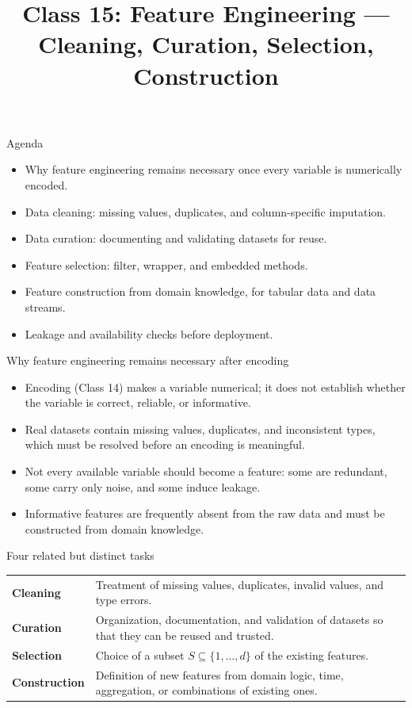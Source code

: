 
\usepackage{amssymb}

\title{Class 15: Feature Engineering --- Cleaning, Curation, Selection, Construction}
\author{\coursename}
\date{}



\frame{\titlepage \coursefooter}

\begin{frame}{Agenda}
\begin{itemize}
\item Why feature engineering remains necessary once every variable is numerically encoded.
\item Data cleaning: missing values, duplicates, and column-specific imputation.
\item Data curation: documenting and validating datasets for reuse.
\item Feature selection: filter, wrapper, and embedded methods.
\item Feature construction from domain knowledge, for tabular data and data streams.
\item Leakage and availability checks before deployment.
\end{itemize}
\coursefooter
\end{frame}

\begin{frame}{Why feature engineering remains necessary after encoding}
\begin{itemize}
\item Encoding (Class 14) makes a variable numerical; it does not establish whether the variable is correct, reliable, or informative.
\item Real datasets contain missing values, duplicates, and inconsistent types, which must be resolved before an encoding is meaningful.
\item Not every available variable should become a feature: some are redundant, some carry only noise, and some induce leakage.
\item Informative features are frequently absent from the raw data and must be constructed from domain knowledge.
\end{itemize}
\coursefooter
\end{frame}

\begin{frame}{Four related but distinct tasks}
\begin{tabularx}{\textwidth}{>{\bfseries}l X}
Cleaning & Treatment of missing values, duplicates, invalid values, and type errors. \\
\addlinespace[0.3em]
Curation & Organization, documentation, and validation of datasets so that they can be reused and trusted. \\
\addlinespace[0.3em]
Selection & Choice of a subset $S \subseteq \{1, \dots, d\}$ of the existing features. \\
\addlinespace[0.3em]
Construction & Definition of new features from domain logic, time, aggregation, or combinations of existing ones. \\
\bottomrule
\end{tabularx}
\coursefooter
\end{frame}

